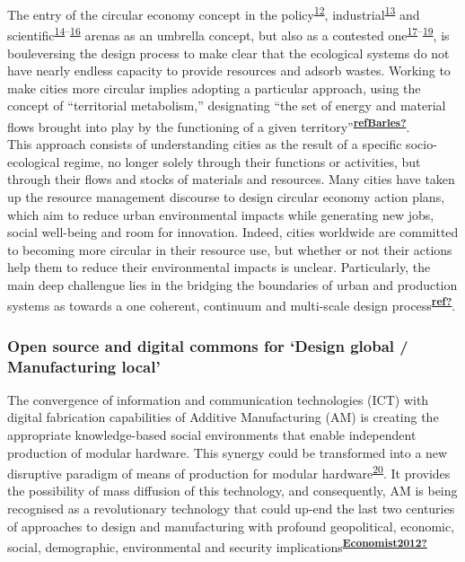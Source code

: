 \documentclass[
  11pt,
  a4paperpaper,
  onecolumn]{article}
\begin{document}
The entry of the circular economy concept in the
policy\textsuperscript{\protect\hyperlink{ref-EC2015}{12}},
industrial\textsuperscript{\protect\hyperlink{ref-EllenMacArthurFoundation2015}{13}}
and
scientific\textsuperscript{\protect\hyperlink{ref-nobre2021}{14}--\protect\hyperlink{ref-Schoggl2020}{16}}
arenas as an umbrella concept, but also as a contested
one\textsuperscript{\protect\hyperlink{ref-CalistoFriant2020}{17}--\protect\hyperlink{ref-corvellec2021}{19}},
is bouleversing the design process to make clear that the ecological
systems do not have nearly endless capacity to provide resources and
adsorb wastes. Working to make cities more circular implies adopting a
particular approach, using the concept of ``territorial metabolism,''
designating ``the set of energy and material flows brought into play by
the functioning of a given
territory''\textsuperscript{\protect\hyperlink{ref-refBarles}{\textbf{refBarles?}}}.\\
This approach consists of understanding cities as the result of a
specific socio-ecological regime, no longer solely through their
functions or activities, but through their flows and stocks of materials
and resources. Many cities have taken up the resource management
discourse to design circular economy action plans, which aim to reduce
urban environmental impacts while generating new jobs, social well-being
and room for innovation. Indeed, cities worldwide are committed to
becoming more circular in their resource use, but whether or not their
actions help them to reduce their environmental impacts is unclear.
Particularly, the main deep challengue lies in the bridging the
boundaries of urban and production systems as towards a one coherent,
continuum and multi-scale design
process\textsuperscript{\protect\hyperlink{ref-ref}{\textbf{ref?}}}.

\hypertarget{open-source-and-digital-commons-for-design-global-manufacturing-local}{%
\subsubsection{Open source and digital commons for `Design global /
Manufacturing
local'}\label{open-source-and-digital-commons-for-design-global-manufacturing-local}}

The convergence of information and communication technologies (ICT) with
digital fabrication capabilities of Additive Manufacturing (AM) is
creating the appropriate knowledge-based social environments that enable
independent production of modular hardware. This synergy could be
transformed into a new disruptive paradigm of means of production for
modular
hardware\textsuperscript{\protect\hyperlink{ref-Kostakis2013}{20}}. It
provides the possibility of mass diffusion of this technology, and
consequently, AM is being recognised as a revolutionary technology that
could up-end the last two centuries of approaches to design and
manufacturing with profound geopolitical, economic, social, demographic,
environmental and security
implications\textsuperscript{\protect\hyperlink{ref-Economist2012}{\textbf{Economist2012?}}}
\end{document}
